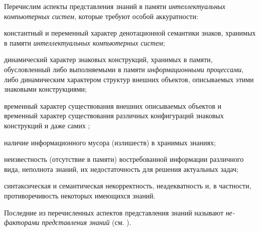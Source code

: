 Перечислим аспекты представления знаний в памяти \textit{интеллектуальных компьютерных систем}, которые требуют особой аккуратности:
\begin{textitemize}
	\item константный и переменный характер денотационной семантики знаков, хранимых в памяти \textit{интеллектуальных компьютерных систем};
	\item динамический характер знаковых конструкций, хранимых в памяти, обусловленный либо выполняемыми в памяти \textit{информационными процессами}, либо динамическим характером структур внешних объектов, описываемых этими знаковыми конструкциями;
	\item временный характер существования внешних описываемых объектов и временный характер существования различных конфигураций знаковых конструкций и даже самих ;
	\item наличие информационного мусора (излишеств) в хранимых знаниях;
	\item неизвестность (отсутствие в памяти) востребованной информации различного вида, неполнота знаний, их недостаточность для решения актуальных задач;
	\item синтаксическая и семантическая некорректность, неадекватность и,  в частности, противоречивость некоторых имеющихся знаний.
\end{textitemize}

Последние из перечисленных аспектов представления знаний называют \textit{не-факторами представления знаний} (см. ).


%